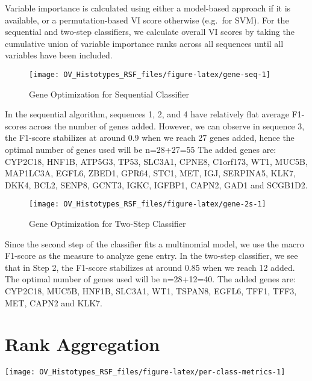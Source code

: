 \documentclass[
]{report}
\begin{document}
Variable importance is calculated using either a model-based approach if it is available, or a permutation-based VI score otherwise (e.g.~for SVM). For the sequential and two-step classifiers, we calculate overall VI scores by taking the cumulative union of variable importance ranks across all sequences until all variables have been included.

\begin{figure}[H]

{\centering \texttt{[image: OV\_Histotypes\_RSF\_files/figure-latex/gene-seq-1]} 

}

\caption{Gene Optimization for Sequential Classifier}\label{fig:gene-seq}
\end{figure}

In the sequential algorithm, sequences 1, 2, and 4 have relatively flat average F1-scores across the number of genes added. However, we can observe in sequence 3, the F1-score stabilizes at around 0.9 when we reach 27 genes added, hence the optimal number of genes used will be n=28+27=55 The added genes are: CYP2C18, HNF1B, ATP5G3, TP53, SLC3A1, CPNE8, C1orf173, WT1, MUC5B, MAP1LC3A, EGFL6, ZBED1, GPR64, STC1, MET, IGJ, SERPINA5, KLK7, DKK4, BCL2, SENP8, GCNT3, IGKC, IGFBP1, CAPN2, GAD1 and SCGB1D2.

\begin{figure}[H]

{\centering \texttt{[image: OV\_Histotypes\_RSF\_files/figure-latex/gene-2s-1]} 

}

\caption{Gene Optimization for Two-Step Classifier}\label{fig:gene-2s}
\end{figure}

Since the second step of the classifier fits a multinomial model, we use the macro F1-score as the measure to analyze gene entry. In the two-step classifier, we see that in Step 2, the F1-score stabilizes at around 0.85 when we reach 12 added. The optimal number of genes used will be n=28+12=40. The added genes are: CYP2C18, MUC5B, HNF1B, SLC3A1, WT1, TSPAN8, EGFL6, TFF1, TFF3, MET, CAPN2 and KLK7.

\hypertarget{rank-aggregation}{%
\section{Rank Aggregation}\label{rank-aggregation}}

\begin{center}\texttt{[image: OV\_Histotypes\_RSF\_files/figure-latex/per-class-metrics-1]} \end{center}
\end{document}
